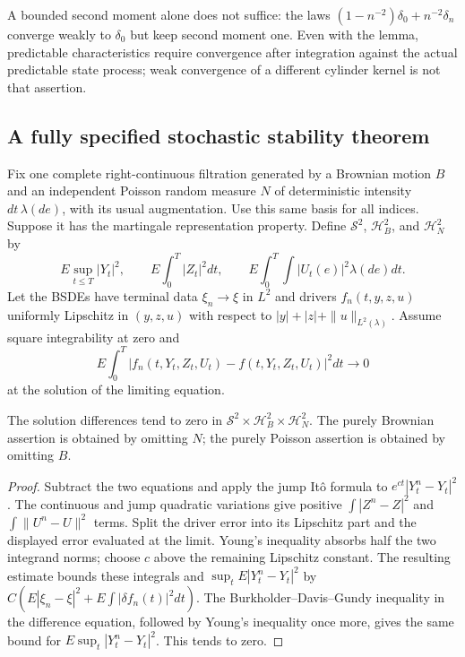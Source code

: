 A bounded second moment alone does not suffice: the laws
$(1-n^{-2})\delta_0+n^{-2}\delta_n$ converge weakly to $\delta_0$ but keep
second moment one.  Even with the lemma, predictable characteristics require
convergence after integration against the actual predictable state process;
weak convergence of a different cylinder kernel is not that assertion.

\subsection{A fully specified stochastic stability theorem}

Fix one complete right-continuous filtration generated by a Brownian motion
$B$ and an independent Poisson random measure $N$ of deterministic intensity
$dt\,\lambda(de)$, with its usual augmentation.  Use this same basis for all
indices.  Suppose it has the martingale representation property.  Define
$\mathcal S^2$, $\mathcal H_B^2$, and $\mathcal H_N^2$ by
\[
 E\sup_{t\le T}|Y_t|^2,
 \qquad E\int_0^T|Z_t|^2dt,
 \qquad E\int_0^T\!\int|U_t(e)|^2\lambda(de)dt.
\]
Let the BSDEs have terminal data $\xi_n\to\xi$ in $L^2$ and drivers
$f_n(t,y,z,u)$ uniformly Lipschitz in $(y,z,u)$ with respect to
$|y|+|z|+\|u\|_{L^2(\lambda)}$.  Assume square integrability at zero and
\[
 E\int_0^T|f_n(t,Y_t,Z_t,U_t)-f(t,Y_t,Z_t,U_t)|^2dt\to0
\]
at the solution of the limiting equation.

\begin{theorem}
\label{thm:r33-c2-bsde}
The solution differences tend to zero in
$\mathcal S^2\times\mathcal H_B^2\times\mathcal H_N^2$.
The purely Brownian assertion is obtained by omitting $N$; the purely
Poisson assertion is obtained by omitting $B$.
\end{theorem}
\begin{proof}
Subtract the two equations and apply the jump It\^o formula to
$e^{ct}|Y_t^n-Y_t|^2$.  The continuous and jump quadratic variations give
positive $\int|Z^n-Z|^2$ and $\int\|U^n-U\|^2$ terms.  Split the driver
error into its Lipschitz part and the displayed error evaluated at the limit.
Young's inequality absorbs half the two integrand norms; choose $c$ above
the remaining Lipschitz constant.  The resulting estimate bounds these
integrals and $\sup_t E|Y_t^n-Y_t|^2$ by
$C(E|\xi_n-\xi|^2+E\int|\delta f_n(t)|^2dt)$.
The Burkholder--Davis--Gundy inequality in the difference equation, followed
by Young's inequality once more, gives the same bound for
$E\sup_t|Y_t^n-Y_t|^2$.  This tends to zero.
\end{proof}

